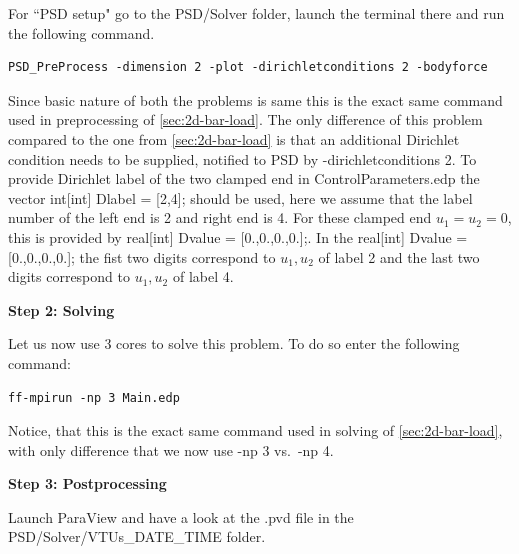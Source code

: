 \documentclass{report}
\begin{document}
For ``PSD setup" go to the {\ttfamily PSD/Solver} folder, launch the terminal there and run the following command.
\begin{lstlisting}[style=Linux]
PSD_PreProcess -dimension 2 -plot -dirichletconditions 2 -bodyforce
\end{lstlisting}
%
Since basic nature of both the problems is same this is the exact same command used in preprocessing of \cref{sec:2d-bar-load}. The only difference of this problem compared to the one from \cref{sec:2d-bar-load} is that an additional Dirichlet condition needs to be supplied, notified to PSD by {\ttfamily -dirichletconditions 2}. To provide Dirichlet label of the two clamped end in {\ttfamily ControlParameters.edp} the vector {\ttfamily int[int] Dlabel = [2,4];} should be used, here we assume that the label number of the left end is 2 and right end is 4. For these clamped end $u_1=u_2=0$, this is provided by {\ttfamily real[int]   Dvalue = [0.,0.,0.,0.];}. In the  {\ttfamily real[int]   Dvalue = [0.,0.,0.,0.];} the fist two digits correspond to $u_1,u_2$ of label 2 and the last two digits correspond to $u_1,u_2$ of label 4.



\textbf{Step 2: Solving}

Let us now use  3 cores to solve this problem. To do so enter the following command:

\begin{lstlisting}[style=Linux]
ff-mpirun -np 3 Main.edp
\end{lstlisting}
%
Notice, that this is the exact same command used in solving of \cref{sec:2d-bar-load}, with only difference that we now use {\ttfamily -np 3} vs.~{\ttfamily -np 4}.


\textbf{Step 3: Postprocessing}

Launch ParaView and have a look at the  {\ttfamily .pvd} file in the  {\ttfamily PSD/Solver/VTUs\_DATE\_TIME} folder. 
\end{document}
